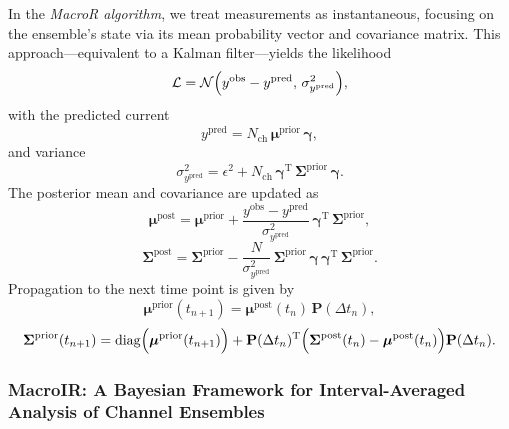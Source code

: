 \documentclass[pdflatex,sn-mathphys-num]{sn-jnl}%
\theoremstyle{thmstyleone}%
\theoremstyle{thmstyletwo}%
\theoremstyle{thmstylethree}%
\begin{document}
In the \textit{MacroR algorithm}, we treat measurements as instantaneous, focusing on the ensemble's state via its mean probability vector and covariance matrix. This approach—equivalent to a Kalman filter—yields the likelihood
\begin{equation}
\mathcal{L} = \mathcal{N}\Bigl( y^{\text{obs}} - y^{\text{pred}},\, \sigma^2_{y^{\text{pred}}} \Bigr),
\label{eq:macro_likelihood}
\end{equation}
with the predicted current
	\begin{equation}
	y^{\text{pred}} = N_{\text{ch}}\, \boldsymbol{\mu}^{\text{prior}}\, \boldsymbol{\gamma},
\label{eq:macro_predicted_y}
\end{equation}
and variance
\begin{equation}
\sigma^2_{y^{\text{pred}}} = \epsilon^2 + N_{\text{ch}}\, \boldsymbol{\gamma}^{\mathrm{T}}\, \boldsymbol{\Sigma}^{\text{prior}}\, \boldsymbol{\gamma}.
	\label{eq:macro_sigma_pred}
	\end{equation}
The posterior mean and covariance are updated as
\begin{equation}
\boldsymbol{\mu}^{\text{post}} = \boldsymbol{\mu}^{\text{prior}} + \frac{y^{\text{obs}} - y^{\text{pred}}}{\sigma^2_{y^{\text{pred}}}}\, \boldsymbol{\gamma}^{\mathrm{T}}\, \boldsymbol{\Sigma}^{\text{prior}},
\label{eq:macro_mean_posterior}
\end{equation}
	\begin{equation}
	\boldsymbol{\Sigma}^{\text{post}} = \boldsymbol{\Sigma}^{\text{prior}} - \frac{N}{\sigma^2_{y^{\text{pred}}}}\, \boldsymbol{\Sigma}^{\text{prior}}\, \boldsymbol{\gamma}\, \boldsymbol{\gamma}^{\mathrm{T}}\, \boldsymbol{\Sigma}^{\text{prior}}.
\label{eq:macro_cov_posterior}
\end{equation}
Propagation to the next time point is given by
\begin{equation}
\boldsymbol{\mu}^{\text{prior}}(t_{n+1}) = \boldsymbol{\mu}^{\text{post}}(t_n)\, \mathbf{P}(\Delta t_n),
	\label{eq:macro_mean_next_prior}
	\end{equation}
\begin{equation}
\boldsymbol{\Sigma}^{\text{prior}}(t_{n+1}) = \mathrm{diag}\Bigl(\boldsymbol{\mu}^{\text{prior}}(t_{n+1})\Bigr) + \mathbf{P}(\Delta t_n)^{\mathrm{T}} \Bigl( \boldsymbol{\Sigma}^{\text{post}}(t_n) - \boldsymbol{\mu}^{\text{post}}(t_n) \Bigr) \mathbf{P}(\Delta t_n).
\label{eq:macro_mean_next_cov}
\end{equation}
\subsubsection{MacroIR: A Bayesian Framework for Interval-Averaged Analysis of Channel Ensembles}
\end{document}
